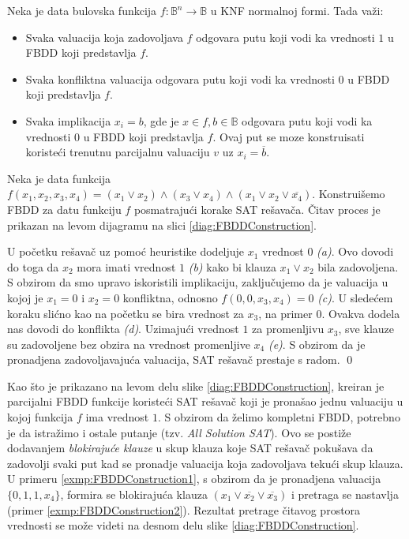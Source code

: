\begin{obsn}
    Neka je data bulovska funkcija $f : \mathbb{B}^{n} \rightarrow \mathbb{B}$  u KNF normalnoj formi. Tada va\v{z}i:
    \begin{itemize}
        \item Svaka valuacija koja zadovoljava $f$ odgovara putu koji vodi ka vrednosti $1$ u FBDD koji predstavlja $f$.
        \item Svaka konfliktna valuacija odgovara putu koji vodi ka vrednosti $0$ u FBDD koji predstavlja $f$.
        \item Svaka implikacija $x_{i} = b$, gde je $x \in f, b \in \mathbb{B}$ odgovara putu koji vodi ka vrednosti $0$ u FBDD koji predstavlja $f$. Ovaj put se moze konstruisati koriste\'c{}i trenutnu parcijalnu valuaciju $v$ uz $x_{i} = \overline{b}$.
    \end{itemize}
\end{obsn}

\begin{exmp}
    Neka je data funkcija $f(x_{1}, x_{2}, x_{3}, x_{4}) = (x_{1} \vee x_{2}) \wedge (x_{3} \vee x_{4}) \wedge (x_{1} \vee x_{2} \vee \overline{x_{4}})$. Konstrui\v{s}emo FBDD za datu funkciju $f$ posmatraju\'c{}i korake SAT re\v{s}ava\v{c}a. \v{C}itav proces je prikazan na levom dijagramu na slici \ref{diag:FBDDConstruction}.

    U po\v{c}etku re\v{s}ava\v{c} uz pomo\'c{} heuristike dodeljuje $x_{1}$ vrednost $0$ \textit{(a)}. Ovo dovodi do toga da $x_{2}$ mora imati vrednost $1$ \textit{(b)} kako bi klauza $x_{1} \vee x_{2}$ bila zadovoljena. S obzirom da smo upravo iskoristili implikaciju, zaklju\v{c}ujemo da je valuacija u kojoj je $x_{1} = 0$ i $x_{2} = 0$ konfliktna, odnosno $f(0, 0, x_{3}, x_{4}) = 0$ \textit{(c)}. U slede\'c{}em koraku sli\'c{}no kao na po\v{c}etku se bira vrednost za $x_{3}$, na primer $0$. Ovakva dodela nas dovodi do konflikta \textit{(d)}. Uzimaju\'c{}i vrednost $1$ za promenljivu $x_{3}$, sve klauze su zadovoljene bez obzira na vrednost promenljive $x_{4}$ \textit{(e)}. S obzirom da je pronadjena zadovoljavaju\'c{}a valuacija, SAT re\v{s}ava\v{c} prestaje s radom.
    \label{exmp:FBDDConstruction1}
    \qed
\end{exmp}

Kao \v{s}to je prikazano na levom delu slike \ref{diag:FBDDConstruction}, kreiran je parcijalni FBDD funkcije koriste\'c{}i SAT re\v{s}ava\v{c} koji je prona\v{s}ao jednu valuaciju u kojoj funkcija $f$ ima vrednost $1$. S obzirom da \v{z}elimo kompletni FBDD, potrebno je da istra\v{z}imo i ostale putanje (tzv. \emph{All Solution SAT}). Ovo se posti\v{z}e dodavanjem \emph{blokiraju\'c{}e klauze} u skup klauza koje SAT re\v{s}ava\v{c} poku\v{s}ava da zadovolji svaki put kad se pronadje valuacija koja zadovoljava teku\'c{}i skup klauza. U primeru \ref{exmp:FBDDConstruction1}, s obzirom da je pronadjena valuacija $\{0, 1, 1, x_{4}\}$, formira se blokiraju\'c{}a klauza $(x_{1} \vee \overline{x_{2}} \vee \overline{x_{3}})$ i pretraga se nastavlja (primer \ref{exmp:FBDDConstruction2}). Rezultat pretrage \v{c}itavog prostora vrednosti se mo\v{z}e videti na desnom delu slike \ref{diag:FBDDConstruction}.

